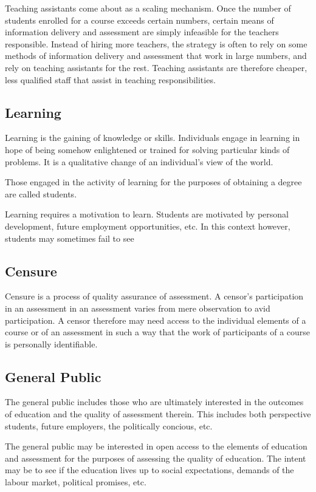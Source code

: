 Teaching assistants come about as a scaling mechanism. Once the number of
students enrolled for a course exceeds certain numbers, certain means of
information delivery and assessment are simply infeasible for the teachers
responsible. Instead of hiring more teachers, the strategy is often to rely on
some methods of information delivery and assessment that work in large numbers,
and rely on teaching assistants for the rest. Teaching assistants are therefore
cheaper, less qualified staff that assist in teaching responsibilities.

\subsection{Learning}

Learning is the gaining of knowledge or skills. Individuals engage in learning
in hope of being somehow enlightened or trained for solving particular kinds of
problems. It is a qualitative change of an individual's view of the
world\cite{ramsden-1992}.

Those engaged in the activity of learning for the purposes of obtaining a
degree are called students.

Learning requires a motivation to learn. Students are motivated by personal development, future employment opportunities, etc. In this context however, students may sometimes fail to see 

\subsection{Censure}

Censure is a process of quality assurance of assessment. A censor's
participation in an assessment in an assessment varies from mere observation to
avid participation. A censor therefore may need access to the individual
elements of a course or of an assessment in such a way that the work of
participants of a course is personally identifiable.

\subsection{General Public}

The general public includes those who are ultimately interested in the outcomes
of education and the quality of assessment therein. This includes both
perspective students, future employers, the politically concious, etc.

The general public may be interested in open access to the elements of
education and assessment for the purposes of assessing the quality of
education. The intent may be to see if the education lives up to social
expectations, demands of the labour market, political promises, etc.

